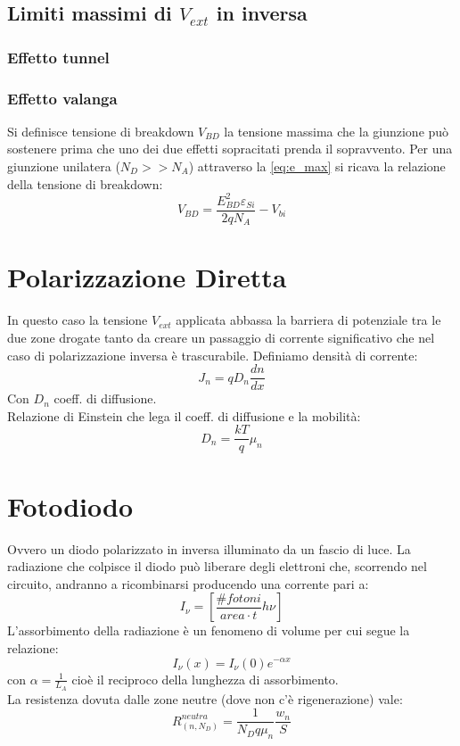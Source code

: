 \documentclass{article}
\begin{document}
\subsection*{Limiti massimi di $V_{ext}$ in inversa}
\subsubsection*{Effetto tunnel}
\subsubsection*{Effetto valanga}
Si definisce tensione di breakdown $V_{BD}$ la tensione massima che la giunzione può sostenere prima che uno dei due effetti sopracitati prenda il sopravvento.
Per una giunzione unilatera ($N_D>>N_A$) attraverso la \eqref{eq:e_max} si ricava la relazione della tensione di breakdown:
\begin{equation*}
V_{BD} = \frac{E_{BD}^2 \varepsilon_{Si}}{2qN_A} - V_{bi}
\end{equation*}

\section*{Polarizzazione Diretta}
In questo caso la tensione $V_{ext}$ applicata abbassa la barriera di potenziale tra le due zone drogate tanto da creare un passaggio di corrente significativo che nel caso di polarizzazione inversa è trascurabile.
Definiamo densità di corrente:
\begin{equation*}
J_n = qD_n \frac{dn}{dx}
\end{equation*}
Con $D_n$ coeff. di diffusione.
\\
Relazione di Einstein che lega il coeff. di diffusione e la mobilità:
\begin{equation*}
D_n = \frac{kT}{q} \mu_n
\end{equation*}

\section*{Fotodiodo}
Ovvero un diodo polarizzato in inversa illuminato da un fascio di luce.
La radiazione che colpisce il diodo può liberare degli elettroni che, scorrendo nel circuito, andranno a ricombinarsi producendo una corrente pari a:
\begin{equation*}
I_\nu = [\frac{\#fotoni}{area \cdot t} h\nu]
\end{equation*}
L'assorbimento della radiazione è un fenomeno di volume per cui segue la relazione:
\begin{equation*}
I_\nu(x) = I_\nu(0) e^{-\alpha x}
\end{equation*}
con $\alpha = \frac{1}{L_A}$ cioè il reciproco della lunghezza di assorbimento.
\\
La resistenza dovuta dalle zone neutre (dove non c'è rigenerazione) vale:
\begin{equation*}
R_{(n, N_D)}^{neutra} = \frac{1}{N_D q \mu_n} \frac{w_n}{S}
\end{equation*}
\end{document}
